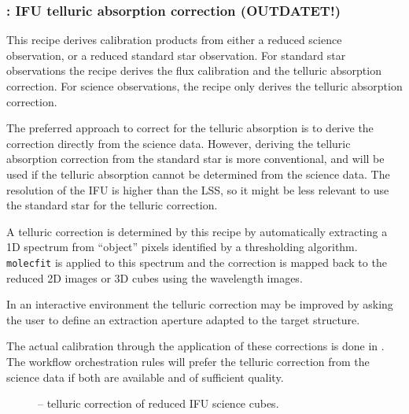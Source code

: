 \clearpage
\subsubsection{: IFU telluric absorption correction (OUTDATET!)}
\label{sssec:ifu_telluric}
\label{rec:metis_ifu_telluric}

This recipe derives calibration products from either a reduced science
observation, or a reduced standard star observation.
For standard star observations the recipe derives the flux calibration and the
telluric absorption correction.
For science observations, the recipe only derives the telluric absorption
correction.

The preferred approach to correct for the telluric absorption is to derive the
correction directly from the science data.
However, deriving the telluric absorption correction from the standard star
is more conventional, and will be used if the telluric absorption cannot be
determined from the science data.
The resolution of the \ac{IFU} is higher than the \ac{LSS}, so it might be less
relevant to use the standard star for the telluric correction.

A telluric correction is determined by this recipe by automatically
extracting a 1D spectrum from ``object'' pixels identified by a
thresholding algorithm. \lstinline{molecfit} is applied to this
spectrum and the correction is mapped back to the reduced 2D images or
3D cubes using the wavelength images.

In an interactive environment the telluric correction may be improved by asking
the user to define an extraction aperture adapted to the target
structure.


The actual calibration through the application of these corrections is done in .
The workflow orchestration rules will prefer the telluric correction from the
science data if both are available and of sufficient quality.



\begin{figure}[hb]
  \centering
    \def \globalscale {0.700000}
    \fontsize{10}{12}\selectfont
    
  \caption[Recipe: ]{
    -- telluric correction of reduced IFU science cubes.}
  \label{fig:metis_ifu_telluric}
\end{figure}

